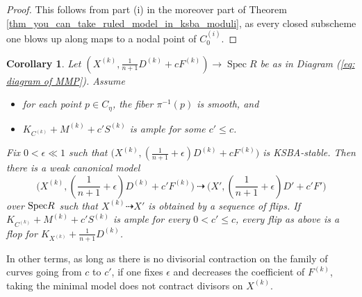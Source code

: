 \documentclass[a4paper,12pt]{amsart}
\DeclareMathOperator{\Spec}{Spec}
\DeclareMathOperator{\Proj}{Proj}
\newcommand{\bP}{{\mathbb P}}
\newcommand{\cO}{{\mathcal{O}}}
\newcommand{\oH}{{\operatorname{H}}}
\newcommand\spec{\text{\rm Spec}}
\newtheorem{corollary}[theorem]{Corollary}
\theoremstyle{definition}
\theoremstyle{remark}
\begin{document}
 \begin{proof}
 This follows from part (i) in the moreover part of Theorem \ref{thm_you_can_take_ruled_model_in_ksba_moduli}, as every closed subscheme one blows up along maps to a nodal point of $C_0^{(i)}$. 
 \end{proof}
 

\begin{corollary}\label{cor_mmp_does_not_contract_divisors}
 Let $(X^{(k)},\frac{1}{n+1}D^{(k)}+cF^{(k)})\to\Spec R $ be as in Diagram (\ref{eq: diagram of MMP}). Assume 
 \begin{itemize}
     \item for each point $p\in C_\eta$, the fiber $\pi^{-1}(p)$ is smooth, and
     \item $K_{C^{(k)}} + M^{(k)} + c'S^{(k)}$ is ample for some $c'\le c$. 
 \end{itemize}
 Fix $0<\epsilon \ll 1$ such that $(X^{(k)},(\frac{1}{n+1}+\epsilon)D^{(k)} + cF^{(k)}\big)$ is KSBA-stable.
 Then there is a weak canonical model $$\textstyle \big(X^{(k)},(\frac{1}{n+1}+\epsilon)D^{(k)} + c'F^{(k)}\big) \ \dashrightarrow\ \big(X',(\frac{1}{n+1}+\epsilon)D'+c'F'\big)$$ over $\spec R $ such that $X^{(k)}\dashrightarrow X'$ is obtained by a sequence of flips. If $K_{C^{(k)}} + M^{(k)} + c'S^{(k)}$ is ample for every $0<c'\le c$, every flip as above is a flop for $K_{X^{(k)}}+\frac{1}{n+1}D^{(k)}$.
\end{corollary}
In other terms, as long as there is no divisorial contraction on the family of curves going from $c$ to $c'$, if one fixes $\epsilon$ and decreases the coefficient of $F^{(k)}$, taking the minimal model does not contract divisors on $X^{(k)}$.
\end{document}

